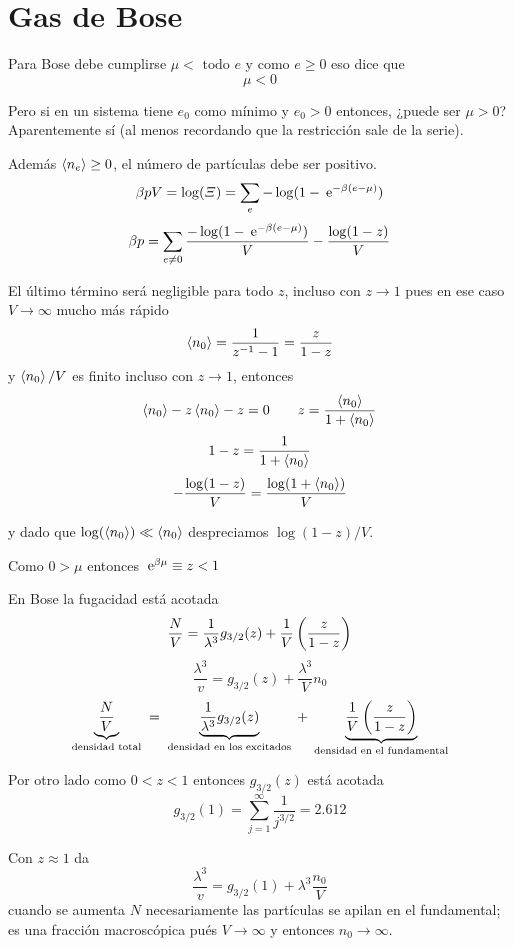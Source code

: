 \documentclass[10pt,oneside]{CBFT_book}
\begin{document}
\chapter{Gas de Bose}

Para Bose debe cumplirse $ \mu < \text{ todo } e $ 
y como $ e \geq 0$ eso dice que 
\[
	\mu < 0
\]

Pero si en un sistema tiene $ e_0 $ como mínimo y $ e_0 > 0 $ entonces, ¿puede ser $ \mu > 0 $?
Aparentemente sí (al menos recordando que la restricción sale de la serie).

Además $ \braket{n_e} \geq 0 $, el número de partículas debe ser positivo.
\[
	\beta p V = \log (\Xi) = \sum_e - \log ( 1 - \:\mathrm{e}^{-\beta(e-\mu)})
\]
\[
	\beta p = \sum_{e \neq 0} \frac{- \log ( 1 - \:\mathrm{e}^{-\beta(e-\mu)}) }{V} - \frac{\log (1-z)}{V}
\]

El último término será negligible para todo $z$, incluso con $z\to 1$ pues en ese caso $V \to \infty$ mucho
más rápido
\[
	\braket{n_0} = \frac{1}{z^{-1}-1} = \frac{z}{1-z}
\]
y $ \braket{n_0} / V $ es finito incluso con $z\to 1$, entonces
\[
	\braket{n_0} - z \braket{n_0} - z = 0 \qquad z = \frac{\braket{n_0}}{1+\braket{n_0}}
\]
\[
	1-z = \frac{1}{1+\braket{n_0}}
\]
\[
	- \frac{\log (1-z)}{V} = \frac{\log (1+\braket{n_0})}{V}
\]
 
y dado que $ \log (\braket{n_0}) \ll \braket{n_0} $ despreciamos $ \log (1-z) / V $.

Como $ 0 > \mu $ entonces $ \:\mathrm{e}^{\beta \mu} \equiv z < 1 $

En Bose la fugacidad está acotada
\[
	\frac{N}{V} = \frac{1}{\lambda^3} g_{3/2}(z) + \frac{1}{V}\left( \frac{ z }{ 1-z } \right)
\]
\[
	\frac{\lambda^3}{v} =  g_{3/2}(z) + \frac{\lambda^3}{V} n_0
\]
\[
	\underbrace{\frac{N}{V}}_{\text{ densidad total }} =
	\underbrace{\frac{1}{\lambda^3} g_{3/2}(z)}_{\text{ densidad en los excitados }} +
	\underbrace{\frac{1}{V}\left( \frac{ z }{ 1-z } \right)}_{\text{ densidad en el fundamental }}
\]

Por otro lado como $ 0 < z < 1 $ entonces $ g_{3/2}(z) $ está acotada 
\[
	g_{3/2}(1) = \sum_{j=1}^\infty \frac{1}{j^{3/2}} = 2.612
\]

Con $z\approx 1$ da
\[
	\frac{\lambda^3}{v} = g_{3/2}(1) + \lambda^3 \frac{n_0}{V} 
\]
cuando se aumenta $N$ necesariamente las partículas se apilan en el fundamental; es una
fracción macroscópica pués $ V \to \infty $ y entonces $ n_0 \to \infty $.
\end{document}
